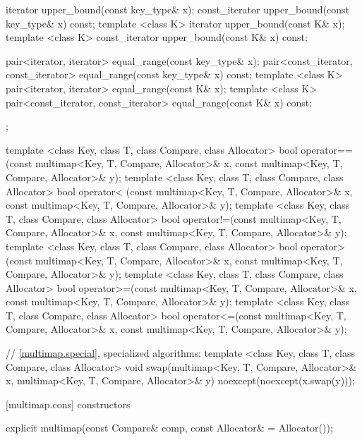 \begin{codeblock}
{{    iterator       upper_bound(const key_type& x);
    const_iterator upper_bound(const key_type& x) const;
    template <class K> iterator       upper_bound(const K& x);
    template <class K> const_iterator upper_bound(const K& x) const;

    pair<iterator, iterator>               equal_range(const key_type& x);
    pair<const_iterator, const_iterator>   equal_range(const key_type& x) const;
    template <class K>
      pair<iterator, iterator>             equal_range(const K& x);
    template <class K>
      pair<const_iterator, const_iterator> equal_range(const K& x) const;
  };

  template <class Key, class T, class Compare, class Allocator>
    bool operator==(const multimap<Key, T, Compare, Allocator>& x,
                    const multimap<Key, T, Compare, Allocator>& y);
  template <class Key, class T, class Compare, class Allocator>
    bool operator< (const multimap<Key, T, Compare, Allocator>& x,
                    const multimap<Key, T, Compare, Allocator>& y);
  template <class Key, class T, class Compare, class Allocator>
    bool operator!=(const multimap<Key, T, Compare, Allocator>& x,
                    const multimap<Key, T, Compare, Allocator>& y);
  template <class Key, class T, class Compare, class Allocator>
    bool operator> (const multimap<Key, T, Compare, Allocator>& x,
                    const multimap<Key, T, Compare, Allocator>& y);
  template <class Key, class T, class Compare, class Allocator>
    bool operator>=(const multimap<Key, T, Compare, Allocator>& x,
                    const multimap<Key, T, Compare, Allocator>& y);
  template <class Key, class T, class Compare, class Allocator>
    bool operator<=(const multimap<Key, T, Compare, Allocator>& x,
                    const multimap<Key, T, Compare, Allocator>& y);

  // \ref{multimap.special}, specialized algorithms:
  template <class Key, class T, class Compare, class Allocator>
    void swap(multimap<Key, T, Compare, Allocator>& x,
              multimap<Key, T, Compare, Allocator>& y)
      noexcept(noexcept(x.swap(y)));
}
\end{codeblock}%
%

[multimap.cons]{ constructors}

%
\begin{itemdecl}
explicit multimap(const Compare& comp, const Allocator& = Allocator());
\end{itemdecl}

